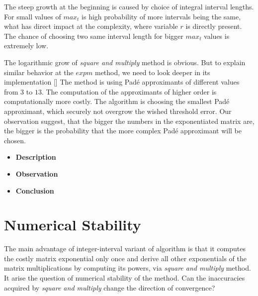 \documentclass[thesis=M,english]{FITthesis}[2012/10/20]
\begin{document}
\begin{itemize}
The steep growth at the beginning is caused by choice of integral interval lengths. For small values of $max_t$ is high probability of more intervals being the same, what has direct impact at the complexity, where variable $r$ is directly present. The chance of choosing two same interval length for bigger $max_t$ values is extremely low.

The logarithmic grow of \textit{square and multiply} method is obvious. But to explain similar behavior at the $expm$ method, we need to look deeper in its implementation []%
The method is using Pad\'{e} approximants of different values from $3$ to $13$. The computation of the approximants of higher order is computationally more costly. The algorithm is choosing the smallest  Pad\'{e} approximant, which securely not overgrow the wished threshold error. Our observation suggest, that the bigger the numbers in the exponentiated matrix are, the bigger is the probability that the more complex Pad\'{e} approximant will be chosen.     

\end{itemize}

\begin{itemize}
\item \textbf{ Description }
\item \textbf{ Observation }
\item \textbf{ Conclusion }
\end{itemize}


\section{Numerical Stability}\label{sec:ns} 

The main advantage of integer-interval variant of algorithm is that it computes the costly matrix exponential only once and derive all other exponentials of the matrix multiplications by computing its powers, via \textit{square and multiply} method. It arise the question of numerical stability of the method. Can the inaccuracies acquired by \textit{square and multiply} change the direction of convergence?   
\end{document}
